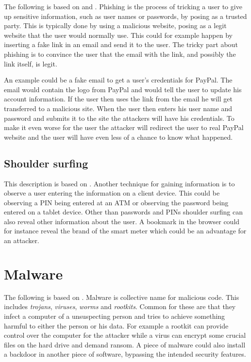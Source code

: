 The following is based on \citet{security_engineering_ross_anderson} and \citet{dhamija2006phishing}.
Phishing is the process of tricking a user to give up sensitive information, such as user names or passwords, by posing as a trusted party.
This is typically done by using a malicious website, posing as a legit website that the user would normally use.
This could for example happen by inserting a fake link in an email and send it to the user.
The tricky part about phishing is to convince the user that the email with the link, and possibly the link itself, is legit.

An example could be a fake email to get a user's credentials for PayPal.
The email would contain the logo from PayPal and would tell the user to update his account information.
If the user then uses the link from the email he will get transferred to a malicious site.
When the user then enters his user name and password and submits it to the site the attackers will have his credentials.
To make it even worse for the user the attacker will redirect the user to real PayPal website and the user will have even less of a chance to know what happened.

\subsection{Shoulder surfing}\label{attack:shoulder}
This description is based on \citet{notechhack}.
Another technique for gaining information is to observe a user entering the information on a client device. 
This could be observing a PIN being entered at an ATM or observing the password being entered on a tablet device.
Other than passwords and PINs shoulder surfing can also reveal other information about the user.
A bookmark in the browser could for instance reveal the brand of the smart meter which could be an advantage for an attacker.

\section{Malware}\label{attack:malware}
The following is based on \citet[p.~644]{security_engineering_ross_anderson}.
Malware is collective name for malicious code. 
This includes \emph{trojans}, \emph{viruses}, \emph{worms} and \emph{rootkits}.
Common for these are that they infect a computer of a unsuspecting person and tries to achieve something harmful to either the person or his data.
For example a rootkit can provide control over the computer for the attacker while a virus can encrypt some crucial files on the hard drive and demand ransom.
A piece of malware could also install a backdoor in another piece of software, bypassing the intended security features.

